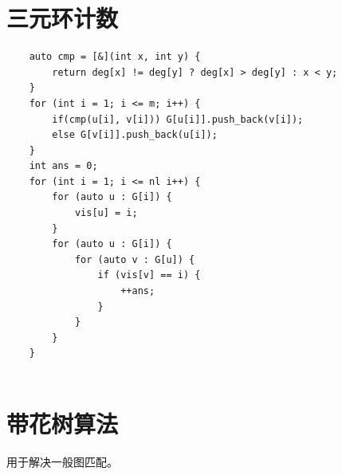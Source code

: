 \documentclass[a4paper,11pt,twoside,fontset = fandol,UTF8]{ctexbook} %
\begin{document}
	\section{三元环计数}
	\begin{lstlisting}
	auto cmp = [&](int x, int y) {
	    return deg[x] != deg[y] ? deg[x] > deg[y] : x < y;   
	}
	for (int i = 1; i <= m; i++) {
	    if(cmp(u[i], v[i])) G[u[i]].push_back(v[i]);   
	    else G[v[i]].push_back(u[i]);
	}
	int ans = 0;
	for (int i = 1; i <= nl i++) {
	    for (auto u : G[i]) {
	        vis[u] = i;
	    }
	    for (auto u : G[i]) {
	        for (auto v : G[u]) {
	            if (vis[v] == i) {
	                ++ans;
	            }   
	        }
	    }   
	}
	
	\end{lstlisting}
	\section{带花树算法}
	用于解决一般图匹配。
\end{document}
